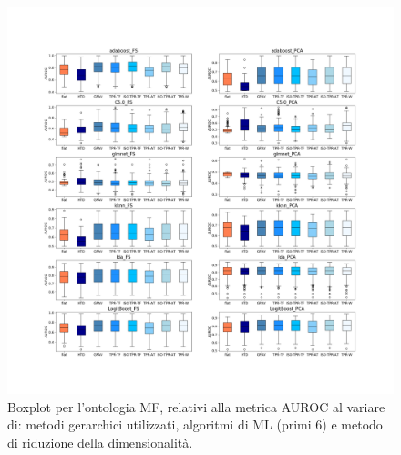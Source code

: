 \documentclass[12pt]{report}
\begin{document}
\begin{appendices}
\begin{figure}[h]
 \hspace*{-2.6cm}
\includegraphics[scale=0.34]{./images/MF_AUC_1.png}
\caption{\footnotesize{Boxplot per l'ontologia MF, relativi alla metrica AUROC al variare di: metodi gerarchici utilizzati, algoritmi di ML (primi 6) e metodo di riduzione della dimensionalità.}}
\label{MF_AUC_1}
\end{figure}


\end{appendices}
\end{document}
